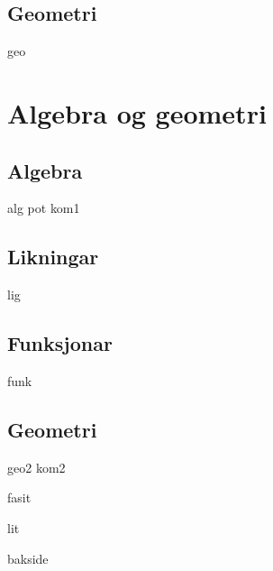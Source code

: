 \chapter{Geometri}
\newpage
{geo}

\part{Algebra og geometri \label{Del2}}
\chapter{Algebra}
\newpage
{alg}
{pot}
\newpage
{kom1}

\chapter{Likningar \label{Likningar}}
\newpage
{lig}

\chapter{Funksjonar \label{Funksjoner}}
{funk}

\chapter{Geometri}
\newpage
{geo2}
\newpage
{kom2}


\newpage
{}
{}
{fasit}

{lit}
{\printindex {}
	}
{bakside}

















